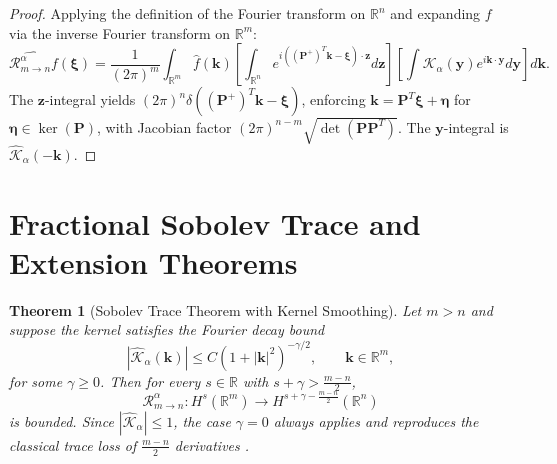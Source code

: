 \documentclass[11pt,a4paper]{article}
\theoremstyle{plain}
\newtheorem{theorem}{Theorem}[section]
\theoremstyle{definition}
\theoremstyle{remark}
\numberwithin{equation}{section}
\begin{document}
\begin{proof}
Applying the definition of the Fourier transform on $\mathbb{R}^n$ and expanding $f$ via the inverse Fourier transform on $\mathbb{R}^m$:
\begin{equation}
\widehat{\mathcal{R}_{m \to n}^\alpha f}(\boldsymbol{\xi}) = \frac{1}{(2\pi)^m}\int_{\mathbb{R}^m} \widehat{f}(\mathbf{k}) \left[\int_{\mathbb{R}^n} e^{i((\mathbf{P}^+)^T\mathbf{k} - \boldsymbol{\xi})\cdot\mathbf{z}} d\mathbf{z}\right] \left[\int \mathcal{K}_\alpha(\mathbf{y}) e^{i\mathbf{k}\cdot\mathbf{y}} d\mathbf{y}\right] d\mathbf{k}.
\end{equation}
The $\mathbf{z}$-integral yields $(2\pi)^n \delta((\mathbf{P}^+)^T\mathbf{k} - \boldsymbol{\xi})$, enforcing $\mathbf{k} = \mathbf{P}^T\boldsymbol{\xi} + \boldsymbol{\eta}$ for $\boldsymbol{\eta} \in \operatorname{ker}(\mathbf{P})$, with Jacobian factor $(2\pi)^{n-m}\sqrt{\det(\mathbf{P}\mathbf{P}^T)}$. The $\mathbf{y}$-integral is $\widehat{\mathcal{K}}_\alpha(-\mathbf{k})$.
\end{proof}

\section{Fractional Sobolev Trace and Extension Theorems}

\begin{theorem}[Sobolev Trace Theorem with Kernel Smoothing]
\label{thm:sobolev_trace}
Let $m > n$ and suppose the kernel satisfies the Fourier decay bound
\begin{equation}
\label{eq:decay_gamma}
|\widehat{\mathcal{K}}_\alpha(\mathbf{k})| \le C (1 + |\mathbf{k}|^2)^{-\gamma/2}, \qquad \mathbf{k} \in \mathbb{R}^m,
\end{equation}
for some $\gamma \ge 0$. Then for every $s \in \mathbb{R}$ with $s + \gamma > \frac{m-n}{2}$,
\begin{equation}
\mathcal{R}_{m \to n}^\alpha : H^s(\mathbb{R}^m) \longrightarrow H^{s + \gamma - \frac{m-n}{2}}(\mathbb{R}^n)
\end{equation}
is bounded. Since $|\widehat{\mathcal{K}}_\alpha| \le 1$, the case $\gamma = 0$ always applies and reproduces the classical trace loss of $\frac{m-n}{2}$ derivatives \cite{adams2003}.
\end{theorem}
\end{document}
